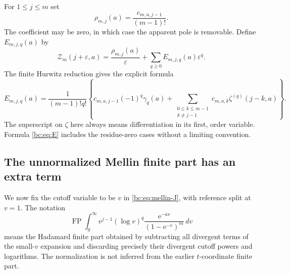\documentclass[11pt,letterpaper]{article}
\numberwithin{equation}{section}
\theoremstyle{definition}
\theoremstyle{remark}
\newcommand{\bcFP}{\operatorname{FP}}
\newcommand{\bcZ}{\mathcal Z}
\newcommand{\bce}{\mathrm e}
\begin{document}
For $1\le j\le m$ set
\begin{equation}\label{bc:eq:rho}
 \rho_{m,j}(a)=\frac{c_{m,a,j-1}}{(m-1)!}.
\end{equation}
The coefficient may be zero, in which case the apparent pole is
removable. Define $E_{m,j,q}(a)$ by
\begin{equation}\label{bc:eq:Z-Laurent}
 \bcZ_m(j+\varepsilon,a)=\frac{\rho_{m,j}(a)}\varepsilon
                         +\sum_{q\ge0}E_{m,j,q}(a)\varepsilon^q.
\end{equation}
The finite Hurwitz reduction gives the explicit formula
\begin{equation}\label{bc:eq:E}
 E_{m,j,q}(a)=\frac{1}{(m-1)!q!}
 \left\{c_{m,a,j-1}(-1)^q\gamma_q(a)
       +\sum_{\substack{0\le k\le m-1\\k\ne j-1}}
               c_{m,a,k}\zeta^{(q)}(j-k,a)\right\}.
\end{equation}
The superscript on $\zeta$ here always means differentiation in its
first, order variable. Formula \eqref{bc:eq:E} includes the residue-zero
cases without a limiting convention.

\subsection{The unnormalized Mellin finite part has an extra term}

We now fix the cutoff variable to be $v$ in \eqref{bc:eq:mellin-J}, with
reference split at $v=1$. The notation
\[
 \bcFP\int_0^\infty v^{j-1}(\log v)^q
                   \frac{\bce^{-av}}{(1-\bce^{-v})^m}\,dv
\]
means the Hadamard finite part obtained by subtracting all divergent
terms of the small-$v$ expansion and discarding precisely their
divergent cutoff powers and logarithms. The normalization is not
inferred from the earlier $t$-coordinate finite part.
\end{document}

